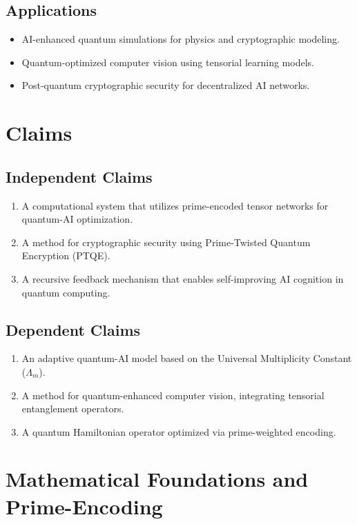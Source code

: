 \documentclass{article}
\theoremstyle{plain}
\begin{document}
\begin{itemize}
\subsection{Applications}
\begin{itemize}
    \item AI-enhanced quantum simulations for physics and cryptographic modeling.
    \item Quantum-optimized computer vision using tensorial learning models.
    \item Post-quantum cryptographic security for decentralized AI networks.
\end{itemize}

\section{Claims}

\subsection{Independent Claims}
\begin{enumerate}
    \item A computational system that utilizes prime-encoded tensor networks for quantum-AI optimization.
    \item A method for cryptographic security using Prime-Twisted Quantum Encryption (PTQE).
    \item A recursive feedback mechanism that enables self-improving AI cognition in quantum computing.
\end{enumerate}

\subsection{Dependent Claims}
\begin{enumerate}
    \item An adaptive quantum-AI model based on the Universal Multiplicity Constant ($\Lambda_m$).
    \item A method for quantum-enhanced computer vision, integrating tensorial entanglement operators.
    \item A quantum Hamiltonian operator optimized via prime-weighted encoding.
\end{enumerate}

\section{Mathematical Foundations and Prime-Encoding}


\end{itemize}
\end{document}
